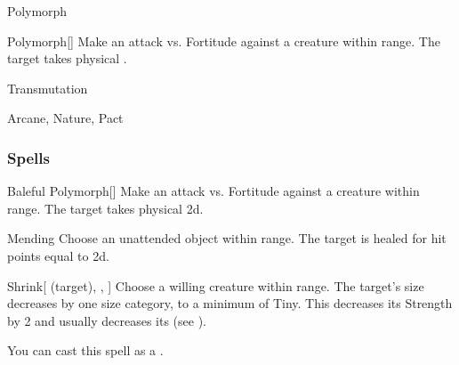 \newpage
\begin{spellsection}{Polymorph}

\begin{spellheader}
\end{spellheader}


\begin{ability}{Polymorph}[]
Make an attack vs. Fortitude against a creature within \rngmed range.
\hit The target takes physical .
\end{ability}




 Transmutation

 Arcane, Nature, Pact
\end{spellsection}


\subsubsection{Spells}


\lowercase{\hypertarget{spell:Baleful Polymorph}{}}\label{spell:Baleful Polymorph}
\begin{ability}[\nth{1}]{\hypertarget{spell:Baleful Polymorph}{Baleful Polymorph}}[]
Make an attack vs. Fortitude against a creature within \rngmed range.
\hit The target takes physical  \plus2d.
\end{ability}
\vspace{0.25em}



\lowercase{\hypertarget{spell:Mending}{}}\label{spell:Mending}
\begin{ability}[\nth{1}]{\hypertarget{spell:Mending}{Mending}}
Choose an unattended object within \rngclose range.
The target is healed for hit points equal to  \plus2d.
\end{ability}
\vspace{0.25em}



\lowercase{\hypertarget{spell:Shrink}{}}\label{spell:Shrink}
\begin{ability}[\nth{1}]{\hypertarget{spell:Shrink}{Shrink}}[ (target), , ]
Choose a willing creature within \rngclose range.
The target's size decreases by one size category, to a minimum of Tiny.
This decreases its Strength by 2 and usually decreases its  (see ).

You can cast this spell as a .
\end{ability}
\vspace{0.25em}



